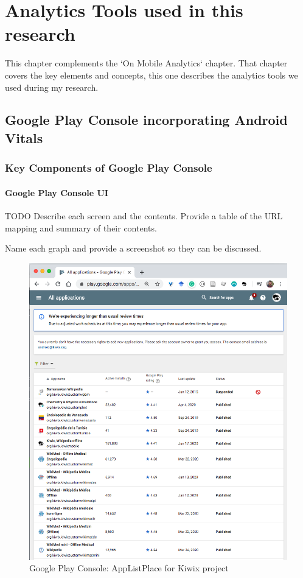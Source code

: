 \chapter{Analytics Tools used in this research}
This chapter complements the `On Mobile Analytics` chapter. That chapter covers the key elements and concepts, this one describes the analytics tools we used during my research.

\section{Google Play Console incorporating Android Vitals}\label{google_play_console_section}

\subsection{Key Components of Google Play Console}
\subsubsection{Google Play Console UI}

TODO Describe each screen and the contents. Provide a table of the URL mapping and summary of their contents.

Name each graph and provide a screenshot so they can be discussed.

\begin{figure}[htbp]
    \centering
    \includegraphics[width=12cm]{images/android-vitals-screenshots/AppListPlace-kiwix-2020-Jun-17.png}
    \caption{Google Play Console: AppListPlace for Kiwix project}
    \label{fig:gpc-applistplace-kiwix}
\end{figure}

